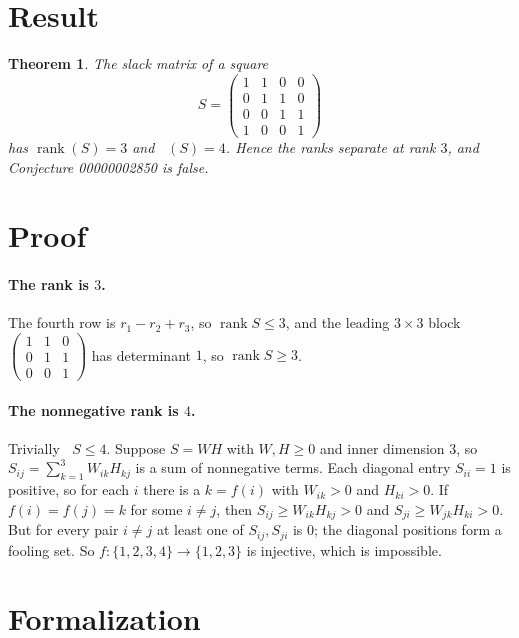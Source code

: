 \documentclass[11pt]{article}
\theoremstyle{plain}
\newtheorem{theorem}{Theorem}
\theoremstyle{definition}
\theoremstyle{remark}
\DeclareMathOperator{\rank}{rank}
\DeclareMathOperator{\rankp}{rank_+}
\begin{document}
\section{Result}

\begin{theorem}\label{thm:main}
The slack matrix of a square
\[
  S=\begin{pmatrix}1&1&0&0\\0&1&1&0\\0&0&1&1\\1&0&0&1\end{pmatrix}
\]
has $\rank(S)=3$ and $\rankp(S)=4$. Hence the ranks separate at rank $3$, and
Conjecture 00000002850 is false.
\end{theorem}

\section{Proof}

\paragraph{The rank is $3$.} The fourth row is $r_1-r_2+r_3$, so $\rank S\le3$,
and the leading $3\times3$ block
$\left(\begin{smallmatrix}1&1&0\\0&1&1\\0&0&1\end{smallmatrix}\right)$ has
determinant $1$, so $\rank S\ge3$.

\paragraph{The nonnegative rank is $4$.} Trivially $\rankp S\le4$. Suppose
$S=WH$ with $W,H\ge0$ and inner dimension $3$, so $S_{ij}=\sum_{k=1}^3W_{ik}H_{kj}$
is a sum of nonnegative terms. Each diagonal entry $S_{ii}=1$ is positive, so
for each $i$ there is a $k=f(i)$ with $W_{ik}>0$ and $H_{ki}>0$. If $f(i)=f(j)=k$
for some $i\ne j$, then $S_{ij}\ge W_{ik}H_{kj}>0$ and $S_{ji}\ge W_{jk}H_{ki}>0$.
But for every pair $i\ne j$ at least one of $S_{ij},S_{ji}$ is $0$; the diagonal
positions form a fooling set. So $f\colon\{1,2,3,4\}\to\{1,2,3\}$ is injective,
which is impossible.

\section{Formalization}
\end{document}
